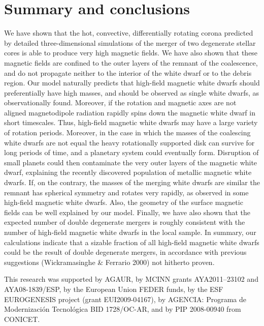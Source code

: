 \documentclass[]{emulateapj}
\begin{document}

\section{Summary and conclusions}
\label{conc}

We have shown that the hot, convective, differentially rotating corona
predicted by  detailed three-dimensional simulations of  the merger of
two degenerate  stellar cores  is able to  produce very  high magnetic
fields.  We have also shown that these magnetic fields are confined to
the  outer  layers of  the  remnant of  the  coalescence,  and do  not
propagate neither to the interior of  the white dwarf or to the debris
region.  Our  model naturally predicts that  high-field magnetic white
dwarfs should preferentially have  high masses, and should be observed
as  single white dwarfs,  as observationally  found. Moreover,  if the
rotation  and magnetic  axes are  not aligned  magnetodipole radiation
rapidly  spins down  the  magnetic white  dwarf  in short  timescales.
Thus, high-field  magnetic white  dwarfs may have  a large  variety of
rotation periods.   Moreover, in the case  in which the  masses of the
coalescing white dwarfs are not equal the heavy rotationally supported
disk  can survive for  long periods  of time,  and a  planetary system
could  eventually  form.   Disruption  of  small  planets  could  then
contaminate  the  very  outer  layers  of the  magnetic  white  dwarf,
explaining  the recently  discovered population  of  metallic magnetic
white dwarfs.   If, on the contrary,  the masses of  the merging white
dwarfs are similar the remnant has spherical symmetry and rotates very
rapidly, as  observed in some high-field magnetic  white dwarfs. Also,
the geometry of  the surface magnetic fields can  be well explained by
our model.  Finally, we  have also shown  that the expected  number of
double  degenerate mergers is  roughly consistent  with the  number of
high-field magnetic white dwarfs in the local sample.  In summary, our
calculations  indicate  that  a  sizable fraction  of  all  high-field
magnetic  white  dwarfs  could  be  the result  of  double  degenerate
mergers,  in accordance with  previous suggestions  (Wickramasinghe \&
Ferrario 2000) not hitherto proven.


\acknowledgments

This research  was supported by AGAUR, by  MCINN grants AYA2011--23102
and  AYA08-1839/ESP, by  the European  Union FEDER  funds, by  the ESF
EUROGENESIS  project (grant  EUI2009-04167), by  AGENCIA:  Programa de
Modernizaci\'on  Tecnol\'ogica BID 1728/OC-AR,  and by  PIP 2008-00940
from CONICET.
\end{document}
